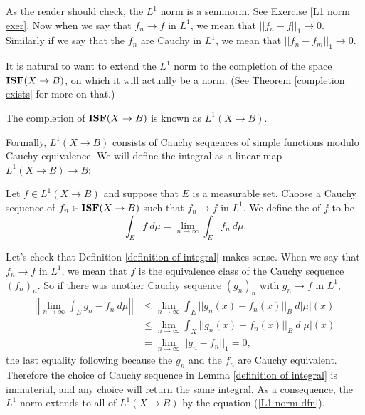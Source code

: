 \begin{subsec}
As the reader should check, the $L^1$ norm is a seminorm. See Exercise \ref{L1 norm exer}.
Now when we say that $f_n \to f$ in $L^1$, we mean that $||f_n - f||_1 \to 0$. Similarly if we say that the $f_n$ are Cauchy in $L^1$, we mean that $||f_n - f_m||_1 \to 0$.
\end{subsec}

\begin{subsec}
It is natural to want to extend the $L^1$ norm to the completion of the space $\mathbf{ISF}(X \to B)$, on which it will actually be a norm.
(See Theorem \ref{completion exists} for more on that.)
\end{subsec}

\begin{definition}
The completion of $\mathbf{ISF}(X \to B)$ is known as $L^1(X \to B)$.
\end{definition}

\begin{subsec}
Formally, $L^1(X \to B)$ consists of Cauchy sequences of simple functions modulo Cauchy equivalence.
We will define the integral as a linear map $L^1(X \to B) \to B$:
\end{subsec}

\begin{definition}
\label{definition of integral}
Let $f \in L^1(X \to B)$ and suppose that $E$ is a measurable set.
Choose a Cauchy sequence of $f_n \in \mathbf{ISF}(X \to B)$ such that $f_n \to f$ in $L^1$.
We define the  of $f$ to be
$$\int_E f~d\mu = \lim_{n \to \infty} \int_E f_n~d\mu.$$
\end{definition}

\begin{subsec}
Let's check that Definition \ref{definition of integral} makes sense. When we say that $f_n \to f$ in $L^1$, we mean that $f$ is the equivalence class of the Cauchy sequence $(f_n)_n$.
So if there was another Cauchy sequence $(g_n)_n$ with $g_n \to f$ in $L^1$,
\begin{align*}\left|\left|\lim_{n \to \infty} \int_E g_n - f_n ~d\mu\right|\right| &\leq \lim_{n \to \infty} \int_E ||g_n(x) - f_n(x)||_B ~d|\mu|(x)\\&
\leq \lim_{n \to \infty} \int_X ||g_n(x) - f_n(x)||_B ~d|\mu|(x)
\\& = \lim_{n \to \infty} ||g_n - f_n||_1 = 0,
\end{align*}
the last equality following because the $g_n$ and the $f_n$ are Cauchy equivalent.
Therefore the choice of Cauchy sequence in Lemma \ref{definition of integral} is immaterial, and any choice will return the same integral.
As a consequence, the $L^1$ norm extends to all of $L^1(X \to B)$ by the equation (\ref{L1 norm dfn}).
\end{subsec}


